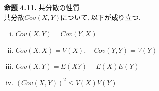 \documentclass[dvipdfmx,10pt, a4j]{jarticle}
\theoremstyle{definition}
\begin{document}
\noindent
\textbf{命題 4.11.} 共分散の性質\\
$共分散Cov(X, Y)について, 以下が成り立つ.$\\
\begin{enumerate}[i)]
    \item $Cov(X, Y) = Cov(Y, X)$\\
    \item $Cov(X, X) = V(X),\quad Cov(Y, Y) = V(Y)$\\
    \item $Cov(X, Y) = E(XY) - E(X)E(Y)$\\
    \item $(Cov(X, Y))^2 \leq V(X)V(Y)$\\
\end{enumerate}
\end{document}

